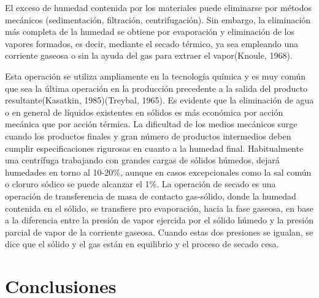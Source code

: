 El exceso de humedad contenida por los materiales puede eliminarse por métodos
mecánicos (sedimentación, filtración, centrifugación). Sin embargo, la
eliminación más completa de la humedad se obtiene por evaporación y eliminación
de los vapores formados, es decir, mediante el secado térmico, ya sea empleando
una corriente gaseosa o sin la ayuda del gas para extraer el vapor(Knoule, 1968).

Esta operación se utiliza ampliamente en la tecnología química y es muy común
que sea la última operación en la producción precedente a la salida del producto
resultante(Kasatkin, 1985)(Treybal, 1965). Es evidente que la eliminación de
agua o en general de líquidos existentes en sólidos es más económica por acción
mecánica que por acción térmica. La dificultad de los medios mecánicos surge
cuando los productos finales y gran número de productos intermedios deben
cumplir especificaciones rigurosas en cuanto a la humedad final. Habitualmente
una centrífuga trabajando con grandes cargas de sólidos húmedos, dejará
humedades en torno al 10-20\%, aunque en casos excepcionales como la sal común o
cloruro sódico se puede alcanzar el 1\%. La operación de secado es una operación
de transferencia de masa de contacto gas-sólido, donde la humedad contenida en
el sólido, se transfiere pro evaporación, hacia la fase gaseosa, en base a la
diferencia entre la presión de vapor ejercida por el sólido húmedo y la presión
parcial de vapor de la corriente gaseosa. Cuando estas dos presiones se igualan,
se dice que el sólido y el gas están en equilibrio y el proceso de secado cesa.



\section{Conclusiones}
